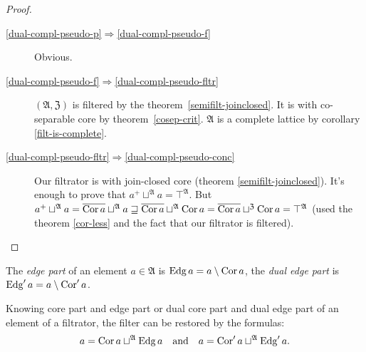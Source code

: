 \begin{proof}
~
\begin{description}
\item [{\ref{dual-compl-pseudo-p}$\Rightarrow$\ref{dual-compl-pseudo-f}}] Obvious.
\item [{\ref{dual-compl-pseudo-f}$\Rightarrow$\ref{dual-compl-pseudo-fltr}}] $(\mathfrak{A},\mathfrak{Z})$
is filtered by the theorem~\ref{semifilt-joinclosed}. It is with
co-separable core by theorem~\ref{cosep-crit}. $\mathfrak{A}$ is
a complete lattice by corollary \ref{filt-is-complete}.
\item [{\ref{dual-compl-pseudo-fltr}$\Rightarrow$\ref{dual-compl-pseudo-conc}}] Our
filtrator is with join-closed core (theorem \ref{semifilt-joinclosed}).
It's enough to prove that $a^{+}\sqcup^{\mathfrak{A}}a=\top^{\mathfrak{A}}$.
But $a^{+}\sqcup^{\mathfrak{A}}a=\overline{\operatorname{Cor} a}\sqcup^{\mathfrak{A}}a\sqsupseteq\overline{\operatorname{Cor} a}\sqcup^{\mathfrak{A}}\operatorname{Cor} a=\overline{\operatorname{Cor} a}\sqcup^{\mathfrak{Z}}\operatorname{Cor} a=\top^{\mathfrak{A}}$
(used the theorem \ref{cor-less} and the fact that our filtrator
is filtered).
\end{description}
\end{proof}
\begin{defn}
The \emph{edge part} of an element $a\in\mathfrak{A}$
is $\operatorname{Edg} a=a\setminus\operatorname{Cor} a$, the \emph{dual edge part} is $\operatorname{Edg}'a=a\setminus\operatorname{Cor}'a$.
\end{defn}
Knowing core part and edge part or dual core part and dual edge part
of an element of a filtrator, the filter can be restored by the formulas:
\[
a=\operatorname{Cor} a\sqcup^{\mathfrak{A}}\operatorname{Edg} a\quad\text{and}\quad a=\operatorname{Cor}'a\sqcup^{\mathfrak{A}}\operatorname{Edg}'a.
\]

